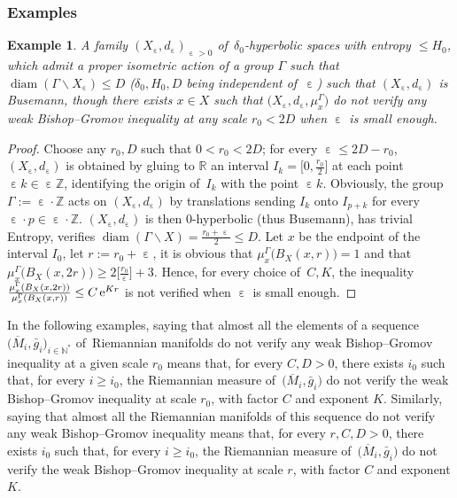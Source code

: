 \documentclass[pdftex]{sigma}
\numberwithin{equation}{section}
\newtheorem{exa}[theor]{Example}
\newcommand{\N}{\mathbb{N}}
\newcommand{\Z}{\mathbb{Z}}
\newcommand{\R}{\mathbb{R}}
\newcommand{\diam}{\operatorname{diam}}
\newcommand{\e}{\operatorname{\varepsilon}}
\begin{document}
\subsubsection{Examples}

\begin{exa}\label{exemplebis} A family $(X_{\e}, d_{\e})_{\e > 0}$ of~$\delta_0$-hyperbolic spaces with entropy $ \le H_0$, which admit a proper isometric action of a group $\Gamma$ such that $\diam (\Gamma \backslash X_{\e}) \le D$ ($\delta_0, H_0, D$ being independent of~$\e$) such that
$(X_{\e}, d_{\e})$ is Busemann, though there exists $x \in X$ such that $\big(X_{\e}, d_{\e}, \mu^\Gamma_x\big)$ do not verify any weak Bishop--Gromov inequality at any scale $r_0 < 2 D$ when $\e$ is small enough.
\end{exa}

\begin{proof}Choose any $r_0, D$ such that $0 < r_0 < 2 D$; for every $ \e \le 2 D - r_0$, $(X_{\e}, d_{\e})$ is obtained by gluing to $\R$ an interval $I_k = \big[0, \frac{r_0}{2} \big]$ at each point $\e k \in
\e \mathbb Z$,
identifying the origin of~$I_k$ with the point $\e k$. Obviously, the group $\Gamma := \e \cdot \Z$ acts on $(X_{\e}, d_{\e})$ by translations sending $I_k$
onto $I_{p+k}$ for every $ \e\cdot p \in \e \cdot \Z$.
$(X_{\e}, d_{\e})$ is then $0$-hyperbolic (thus Busemann), has trivial Entropy, verifies $\diam (\Gamma \backslash X) = \frac{r_0 + \e}{2} \le D $. Let $x$ be the
endpoint of the interval $I_0$, let $r := r_0 + \e$, it is obvious that
$\mu_{x}^{\Gamma}\big(B_X (x, r) \big) = 1$ and that
$\mu_{x}^{\Gamma}\big(B_X (x, 2 r) \big) \ge 2 \big[ \frac{r_0}{\e}\big] + 3 $. Hence, for every choice of~$C, K$, the inequality
$\frac{\mu_{x}^{\Gamma}(B_X (x, 2 r))}{\mu_{x}^{\Gamma}(B_X(x, r))} \le C\, {\rm e}^{Kr}$ is not verified when $\e$ is small enough.
\end{proof}


In the following examples, saying that almost all the elements of a sequence $\big(\overline M_i, \bar g_i\big)_{i \in \N^*}$ of~Riemannian manifolds
do not verify any weak
Bishop--Gromov inequality at a given scale $r_0$ means that, for every $C, D > 0$, there exists $i_0 $ such that, for every $i \ge i_0$, the Riemannian
measure of~$\big(\overline M_i, \bar g_i\big)$ do not verify the weak Bishop--Gromov inequality at scale $ r_0$, with factor $C$ and exponent $K$.
Similarly, saying that almost all the Riemannian manifolds of this sequence do not verify any weak Bishop--Gromov inequality means that,
for every $r, C, D > 0$, there exists $i_0 $ such that, for every $i \ge i_0$, the Riemannian measure of~$\big(\overline M_i, \bar g_i\big)$
do not verify the weak Bishop--Gromov inequality at scale $ r$, with factor $C$ and exponent $K$.
\end{document}
